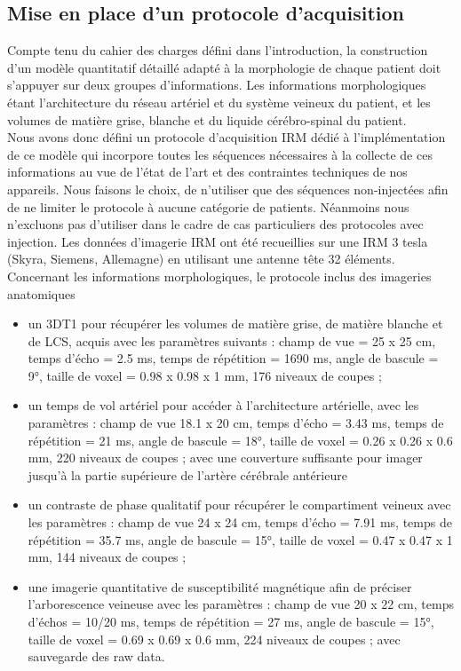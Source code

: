 \subsection{Mise en place d'un protocole d'acquisition}
Compte tenu du cahier des charges défini dans l’introduction, la construction d’un modèle quantitatif détaillé adapté à la morphologie de chaque patient doit s’appuyer sur deux groupes d’informations. Les informations morphologiques étant l’architecture du réseau artériel et du système veineux du patient, et les volumes de matière grise, blanche et du liquide cérébro-spinal du patient.\\
Nous avons donc défini un protocole d’acquisition IRM dédié à l’implémentation de ce modèle qui incorpore toutes les séquences nécessaires à la collecte de ces informations au vue de l’état de l’art et des contraintes techniques de nos appareils. Nous faisons le choix, de n’utiliser que des séquences non-injectées afin de ne limiter le protocole à aucune catégorie de patients. Néanmoins nous n’excluons pas d’utiliser dans le cadre de cas particuliers des protocoles avec injection. Les données d’imagerie IRM ont été recueillies sur une IRM 3 tesla (Skyra, Siemens, Allemagne) en utilisant une antenne tête 32 éléments.\\
Concernant les informations morphologiques, le protocole inclus des imageries anatomiques
\begin{itemize}
\item un 3DT1 pour récupérer les volumes de matière grise, de matière blanche et de LCS, acquis avec les paramètres suivants : champ de vue = 25 x 25 cm, temps d’écho = 2.5 ms, temps de répétition = 1690 ms, angle de bascule = 9°, taille de voxel = 0.98 x 0.98 x 1 mm, 176 niveaux de coupes ;
\item un temps de vol artériel pour accéder à l’architecture artérielle, avec les paramètres : champ de vue 18.1 x 20 cm, temps d’écho = 3.43 ms, temps de répétition = 21 ms, angle de bascule = 18°, taille de voxel = 0.26 x 0.26 x 0.6 mm, 220 niveaux de coupes ; avec une couverture suffisante pour imager jusqu’à la partie supérieure de l’artère cérébrale antérieure
\item un contraste de phase qualitatif pour récupérer le compartiment veineux avec les paramètres : champ de vue 24 x 24 cm, temps d’écho = 7.91 ms, temps de répétition = 35.7 ms, angle de bascule = 15°, taille de voxel = 0.47 x 0.47 x 1 mm, 144 niveaux de coupes ;
\item une imagerie quantitative de susceptibilité magnétique afin de préciser l’arborescence veineuse avec les paramètres : champ de vue 20 x 22 cm, temps d’échos = 10/20 ms, temps de répétition = 27 ms, angle de bascule = 15°, taille de voxel = 0.69 x 0.69 x 0.6 mm, 224 niveaux de coupes ; avec sauvegarde des raw data.
\end{itemize}
